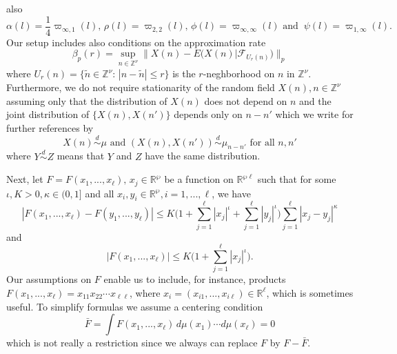 also
\[
{{\alpha}}(l)=\frac{1}{4}\varpi_{\infty,1}(l),\,\rho(l)=\varpi_{2,2}(l),\,
\phi(l)=\varpi_{\infty,\infty}(l)\,\,\mbox{and}\,\,\ \psi(l)=\varpi_{1,
\infty}(l).
\]
Our setup includes also conditions on the  approximation rate
\begin{equation}\label{2.3}
\beta_p(r)=\sup_{n\in{{\mathbb Z}}^\nu}\|X(n)-E\big(X(n)|{{\mathcal F}}_{U_r(n)}\big)\|_p
\end{equation}
where $U_r(n)=\{ \tilde n\in{{\mathbb Z}}^\nu:\, |n-\tilde n|\leq r\}$ is the 
$r$-neghborhood on $n$ in ${{\mathbb Z}}^\nu$. Furthermore, we do not require 
stationarity of the random field $X(n), n\in{{\mathbb Z}}^\nu$ assuming only that the
distribution of $X(n)$ does not depend on $n$ and the joint distribution of 
$\{X(n), X(n')\}$  depends only on $n-n'$ which we write for further references
by 
\begin{equation}\label{2.4}
X(n)\stackrel {d}{\sim}\mu\,\,\mbox{and}\,\,
(X(n),X(n'))\stackrel {d}{\sim}\mu_{n-n'}\,\,\mbox{for all}\,\,n,n'
\end{equation}
where $Y\stackrel {d}{\sim}Z$ means that $Y$ and $Z$ have the same distribution.

Next, let $F= F(x_1,...,x_\ell),\, x_j\in{{\mathbb R}}^{\wp}$ be a function on 
${{\mathbb R}}^{\wp\ell}$ such that for some $\iota,K>0,{{\kappa}}\in (0,1]$ and all 
$x_i,y_i\in{{\mathbb R}}^{\wp}, i=1,...,\ell$, we have
\begin{equation}\label{2.5}
|F(x_1,...,x_\ell)-F(y_1,...,y_\ell)|\leq K\big(1+\sum^\ell_{j=1}|x_j|^\iota+
\sum^\ell_{j=1} |y_j|^\iota \big)\sum^\ell_{j=1}|x_j-y_j|^{{\kappa}}
\end{equation}
and 
\begin{equation}\label{2.6} 
|F(x_1,...,x_\ell)|\leq K\big( 1+\sum^\ell_{j=1}|x_j|^{\iota} \big).
\end{equation}
Our assumptions on $F$ enable us to include, for instance,
products $F(x_1,...,x_\ell)=x_{11}x_{22}\cdots x_{\ell\ell}$, where 
$x_i=(x_{i1},...,x_{i\ell})\in{{\mathbb R}}^\ell$, which is sometimes useful.
To simplify formulas we assume a centering condition
\begin{equation}\label{2.7}
\bar F=\int F(x_1,...,x_\ell)\,d\mu(x_1)\cdots d\mu(x_\ell)=0
\end{equation}
which is not really a restriction since we always can replace $F$ by 
$F-\bar F$.

